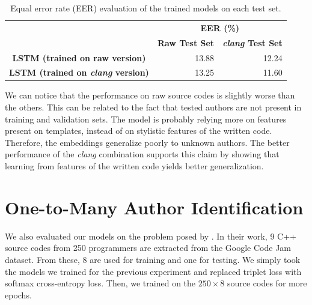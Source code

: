 \begin{table}[ht]
	\centering
	\begin{tabular}{ccr}
		\cline{2-3}
		\multicolumn{1}{l}{}                     & \multicolumn{2}{c}{\textbf{EER (\%)}}                                   \\ \cline{2-3} 
		\textbf{}                                & \textbf{Raw Test Set}     & \multicolumn{1}{l}{\textbf{\textit{clang} Test Set}} \\ \hline
		
		
		\textbf{LSTM (trained on raw version)}   & \multicolumn{1}{r}{13.88} & 12.24                                       \\ \hline
		\textbf{LSTM (trained on \textit{clang} version)} & \multicolumn{1}{r}{13.25} & 11.60                                        \\ \hline
	\end{tabular}
	\caption{Equal error rate (EER) evaluation of the trained models on each test set.}
	\label{tab:matching}
\end{table}

We can notice that the performance on raw source codes is slightly worse than the others. This can be related to the fact that tested authors are not present in training and validation sets. The model is probably relying more on features present on templates, instead of on stylistic features of the written code. Therefore, the embeddings generalize poorly to unknown authors. The better performance of the \textit{clang} combination supports this claim by showing that learning from features of the written code yields better generalization.

\section{One-to-Many Author Identification}\label{sec:one_to_many}

We also evaluated our models on the problem posed by . In their work, 9 C++ source codes from 250 programmers are extracted from the Google Code Jam dataset. From these, 8 are used for training and one for testing. We simply took the models we trained for the previous experiment and replaced triplet loss with softmax cross-entropy loss. Then, we trained on the $250 \times 8$ source codes for more epochs.

